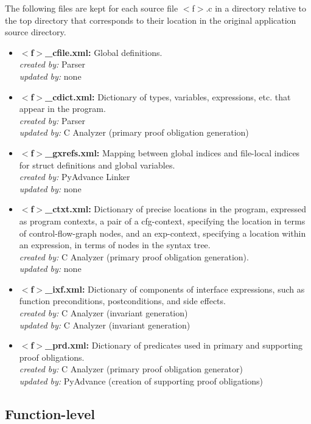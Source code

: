 \documentclass[11pt]{article}
\newcommand\fname{$<$f$>$}
\begin{document}
The following files are kept for each source file \fname.c in a directory relative
to the top directory that corresponds to their location in the original application
source directory.
\begin{itemize}[leftmargin=*]
\item {\bf \fname\_cfile.xml: } Global definitions.\\
   \emph{created by:} Parser \\
   \emph{updated by:} none
\item {\bf \fname\_cdict.xml: } Dictionary of types, variables, expressions, etc.
   that appear in the program.\\
   \emph{created by:} Parser \\
   \emph{updated by:} C Analyzer (primary proof obligation generation)
\item {\bf \fname\_gxrefs.xml: } Mapping between global indices and file-local
   indices for struct definitions and global variables. \\
   \emph{created by:} PyAdvance Linker \\
   \emph{updated by:} none
\item {\bf \fname\_ctxt.xml:} Dictionary of precise locations in the program,
   expressed as program contexts, a pair of a cfg-context, specifying the location
   in terms of control-flow-graph nodes, and an exp-context, specifying a location
   within an expression, in terms of nodes in the syntax tree. \\
   \emph{created by:} C Analyzer (primary proof obligation generation). \\
   \emph{updated by:} none
\item {\bf \fname\_ixf.xml:} Dictionary of components of interface expressions,
   such as function preconditions, postconditions, and side effects.\\
   \emph{created by:} C Analyzer (invariant generation) \\
   \emph{updated by:} C Analyzer (invariant generation)
\item {\bf \fname\_prd.xml:} Dictionary of predicates used in primary and supporting
   proof obligations.\\
   \emph{created by:} C Analyzer (primary proof obligation generator) \\
   \emph{updated by:} PyAdvance (creation of supporting proof obligations)
\end{itemize}

\subsection{Function-level}
\end{document}
